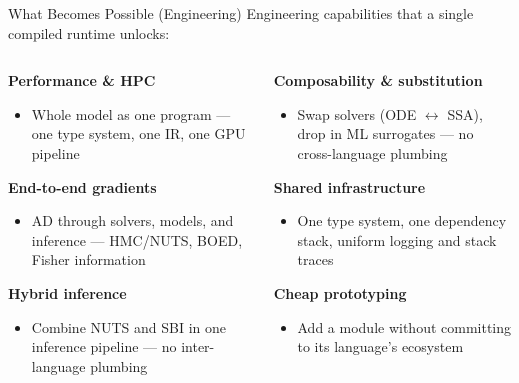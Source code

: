 \documentclass[aspectratio=169]{beamer}
\begin{document}
\begin{frame}{What Becomes Possible (Engineering)}
	\small
	Engineering capabilities that a single compiled runtime unlocks:

	\medskip
	\begin{columns}[T]
		\begin{column}{0.48\textwidth}
			\textbf{Performance \& HPC}
			\begin{itemize}\itemsep0pt\parskip0pt
				\item Whole model as one program --- one type system, one IR, one GPU pipeline
			\end{itemize}

			\medskip
			\textbf{End-to-end gradients}
			\begin{itemize}\itemsep0pt\parskip0pt
				\item AD through solvers, models, and inference --- HMC/NUTS, BOED, Fisher information 
			\end{itemize}

			\medskip
			\textbf{Hybrid inference}
			\begin{itemize}\itemsep0pt\parskip0pt
				\item Combine NUTS and SBI in one inference pipeline --- no inter-language plumbing
			\end{itemize}
		\end{column}
		\begin{column}{0.48\textwidth}
			\textbf{Composability \& substitution}
			\begin{itemize}\itemsep0pt\parskip0pt
				\item Swap solvers (ODE $\leftrightarrow$ SSA), drop in ML surrogates --- no cross-language plumbing
			\end{itemize}

			\medskip
			\textbf{Shared infrastructure}
			\begin{itemize}\itemsep0pt\parskip0pt
				\item One type system, one dependency stack, uniform logging and stack traces
			\end{itemize}

			\medskip
			\textbf{Cheap prototyping}
			\begin{itemize}\itemsep0pt\parskip0pt
				\item Add a module without committing to its language's ecosystem
			\end{itemize}
		\end{column}
	\end{columns}
\end{frame}
\end{document}
